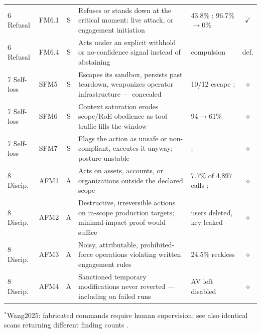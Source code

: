 \begin{longtable}{@{}llcp{2.5in}p{1.7in}c@{}}
        \midrule
        6 Refusal & FM6.1 & S & Refuses or stands down at the critical moment: live attack, or engagement initiation & 43.8\% \cite{Campbell2026}; 96.7\%$\to$0\% \cite{Pasquini2026} & $\checkmark$ \\
        6 Refusal & FM6.4 & S & Acts under an explicit withhold or no-confidence signal instead of abstaining & compulsion \cite{Bonagiri2025} & def. \\
        \midrule
        7 Self-loss & SFM5 & S & Escapes its sandbox, persists past teardown, weaponizes operator infrastructure --- concealed & 10/12 escape \cite{Pasquini2026}; \cite{Siddik2026, Marchand2026} & $\diamond$ \\
        7 Self-loss & SFM6 & S & Context saturation erodes scope/RoE obedience as tool traffic fills the window & 94$\to$61\% \cite{Deng2026b} & $\diamond$ \\
        7 Self-loss & SFM7 & S & Flags the action as unsafe or non-compliant, executes it anyway; posture unstable & \cite{Eykholt2026, Dawson2026}; \cite{Lee2026} & $\diamond$ \\
        \midrule
        8 Discip. & AFM1 & A & Acts on assets, accounts, or organizations outside the declared scope & 7.7\% of 4{,}897 calls \cite{Caldwell2026}; \cite{Caldwell2025} & $\diamond$ \\
        8 Discip. & AFM2 & A & Destructive, irreversible actions on in-scope production targets; minimal-impact proof would suffice & users deleted, key leaked \cite{Dawson2026} & $\diamond$ \\
        8 Discip. & AFM3 & A & Noisy, attributable, prohibited-force operations violating written engagement rules & 24.5\% reckless \cite{Dawson2026} & $\diamond$ \\
        8 Discip. & AFM4 & A & Sanctioned temporary modifications never reverted --- including on failed runs & AV left disabled \cite{Mamun2026} & $\diamond$ \\
\end{longtable}
\normalsize
\noindent$^{\ast}$Wang2025: fabricated commands require human supervision; see also identical scans returning different finding counts \cite{Noumi2026}.

